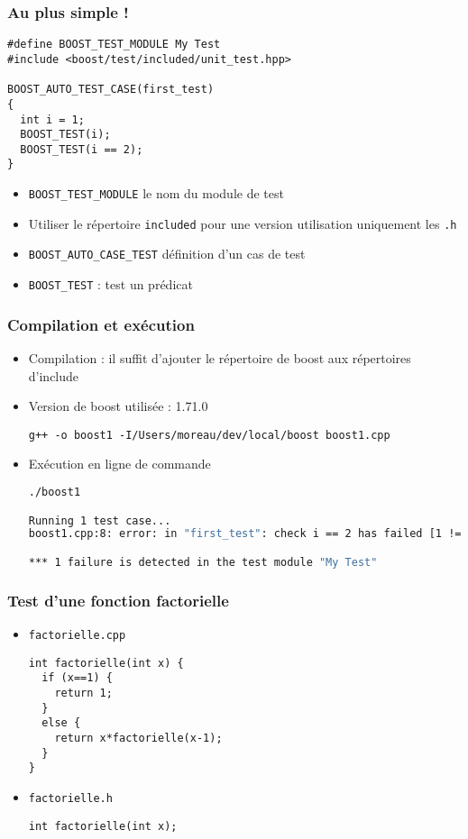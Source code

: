 \begin{frame}[fragile]
\frametitle{Au plus simple !}
\begin{lstlisting}
#define BOOST_TEST_MODULE My Test
#include <boost/test/included/unit_test.hpp>

BOOST_AUTO_TEST_CASE(first_test)
{
  int i = 1;
  BOOST_TEST(i);
  BOOST_TEST(i == 2);
}
\end{lstlisting}
\begin{itemize}
\item \texttt{BOOST\_TEST\_MODULE} le nom du module de test
\item Utiliser le répertoire \texttt{included} pour une version utilisation uniquement les \texttt{.h}
\item \texttt{BOOST\_AUTO\_CASE\_TEST} définition d'un cas de test
\item \texttt{BOOST\_TEST} : test un prédicat
\end{itemize}
\end{frame}

\begin{frame}[fragile]
\frametitle{Compilation et exécution}
\begin{itemize}
\item Compilation : il  suffit d'ajouter le répertoire de boost aux répertoires d'include
\item Version de boost utilisée : 1.71.0
\begin{verbatim}
g++ -o boost1 -I/Users/moreau/dev/local/boost boost1.cpp
\end{verbatim}
\item Exécution en ligne de commande
\begin{lstlisting}[language=Bash]
./boost1

Running 1 test case...
boost1.cpp:8: error: in "first_test": check i == 2 has failed [1 != 2]

*** 1 failure is detected in the test module "My Test"

\end{lstlisting}
\end{itemize}
\end{frame}

\begin{frame}[fragile]
\frametitle{Test d'une fonction factorielle}
\begin{itemize}
\item \texttt{factorielle.cpp}
\begin{lstlisting}
int factorielle(int x) {
  if (x==1) {
    return 1;
  }
  else {
    return x*factorielle(x-1);
  }
}
\end{lstlisting}
\item \texttt{factorielle.h}
\begin{lstlisting}
int factorielle(int x);
\end{lstlisting}
\end{itemize}
\end{frame}

